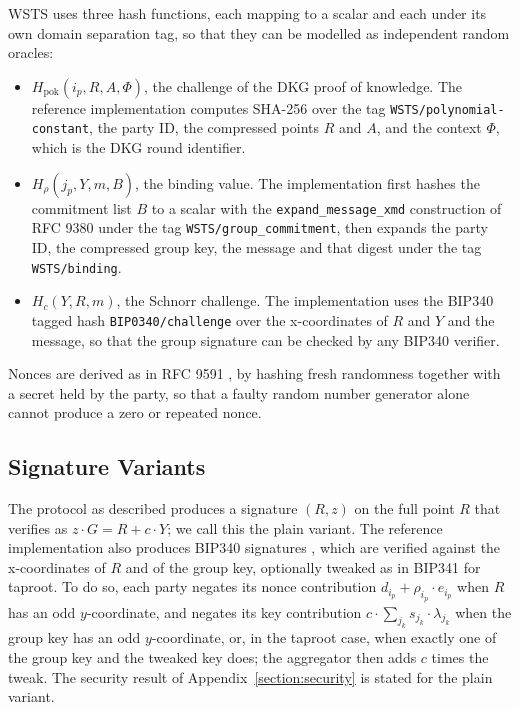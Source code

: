 \documentclass{article}
\theoremstyle{plain}
\theoremstyle{definition}
\theoremstyle{remark}
\begin{document}
WSTS uses three hash functions, each mapping to a scalar and each under its own domain separation tag, so that they can be modelled as independent random oracles:
\begin{itemize}
  \item $H_{\mathrm{pok}}(i_p, R, A, \Phi)$, the challenge of the DKG proof of knowledge.  The reference implementation computes SHA-256 over the tag \texttt{WSTS/polynomial-constant}, the party ID, the compressed points $R$ and $A$, and the context $\Phi$, which is the DKG round identifier.
  \item $H_\rho(j_p, Y, m, B)$, the binding value.  The implementation first hashes the commitment list $B$ to a scalar with the \texttt{expand\_message\_xmd} construction of RFC 9380 under the tag \texttt{WSTS/group\_commitment}, then expands the party ID, the compressed group key, the message and that digest under the tag \texttt{WSTS/binding}.
  \item $H_c(Y, R, m)$, the Schnorr challenge.  The implementation uses the BIP340 tagged hash \texttt{BIP0340/challenge} \cite{bip340} over the x-coordinates of $R$ and $Y$ and the message, so that the group signature can be checked by any BIP340 verifier.
\end{itemize}
Nonces are derived as in RFC 9591 \cite{rfc9591}, by hashing fresh randomness together with a secret held by the party, so that a faulty random number generator alone cannot produce a zero or repeated nonce.

\subsection{
  Signature Variants
}\label{section:variants}

The protocol as described produces a signature $(R, z)$ on the full point $R$ that verifies as $z \cdot G = R + c \cdot Y$; we call this the plain variant.  The reference implementation also produces BIP340 signatures \cite{bip340}, which are verified against the x-coordinates of $R$ and of the group key, optionally tweaked as in BIP341 for taproot.  To do so, each party negates its nonce contribution $d_{i_p} + \rho_{i_p} \cdot e_{i_p}$ when $R$ has an odd $y$-coordinate, and negates its key contribution $c \cdot \sum_{j_k} s_{j_k} \cdot \lambda_{j_k}$ when the group key has an odd $y$-coordinate, or, in the taproot case, when exactly one of the group key and the tweaked key does; the aggregator then adds $c$ times the tweak.  The security result of Appendix~\ref{section:security} is stated for the plain variant.
\end{document}
